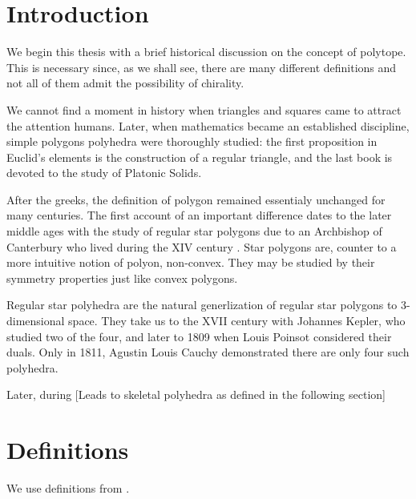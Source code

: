 \documentclass[spanish]{article}
\theoremstyle{definition}
\begin{document}
	\section{Introduction}
	We begin this thesis with a brief historical discussion on the concept of polytope. This is necessary since, as we shall see, there are many different definitions and not all of them admit the possibility of chirality.
	
	We cannot find a moment in history when triangles and squares came to attract the attention humans. Later, when mathematics became an established discipline, simple polygons polyhedra were thoroughly studied: the first proposition in Euclid's elements is the construction of a regular triangle, and the last book is devoted to the study of Platonic Solids.
	
	After the greeks, the definition of polygon remained essentialy unchanged for many centuries. The first account of an important difference dates to the later middle ages with the study of regular star polygons due to an Archbishop of Canterbury who lived during the XIV century \cite{abstract-polytopes}. Star polygons are, counter to a more intuitive notion of polyon, non-convex. They may be studied by their symmetry properties just like convex polygons.
	
	Regular star polyhedra are the natural generlization of regular star polygons to 3-dimensional space. They take us to the XVII century with Johannes Kepler, who studied two of the four, and later to 1809 when Louis Poinsot considered their duals. Only in 1811, Agustin Louis Cauchy demonstrated there are only four such polyhedra.
	
	Later, during [Leads to skeletal polyhedra as defined in the following section]
	
	\section{Definitions}
	We use definitions from \cite{petcox}.
	
\end{document}
